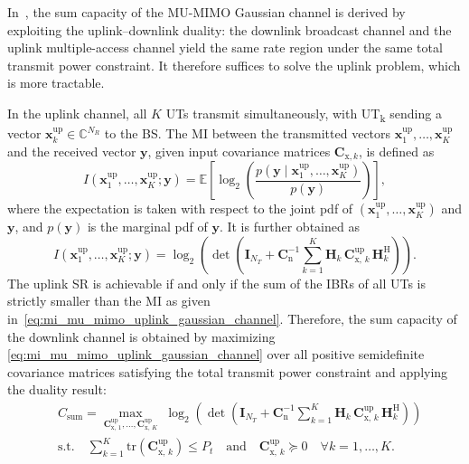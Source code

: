 In~\cite{viswanath_2002, viswanath_2003, yu_2004}, the sum capacity of the \ac{MU}-\ac{MIMO} Gaussian channel is derived by exploiting the uplink--downlink duality: the downlink broadcast channel and the uplink multiple-access channel yield
the same rate region under the same total transmit power constraint. It therefore suffices to solve the uplink problem, which is more tractable.

In the uplink channel, all $K$ \acp{UT} transmit simultaneously, with \ac{UT}\textsubscript{k} sending a vector $\mathbf{x}_k^{\text{up}} \in \mathbb{C}^{N_R}$ to the \ac{BS}.
The \ac{MI} between the transmitted vectors $\mathbf{x}_1^{\text{up}}, \dots, \mathbf{x}_K^{\text{up}}$ and the received vector $\mathbf{y}$, given input covariance matrices $\mathbf{C}_{\mathrm{x},k}$, is defined as
\begin{equation}
\label{eq:mutual_information_mu_mimo_uplink}
    I(\mathbf{x}_1^{\text{up}}, \dots, \mathbf{x}_K^{\text{up}}; \mathbf{y})
    = \mathbb{E}\!\left[ \log_2\!\left( \frac{p(\mathbf{y} \mid \mathbf{x}_1^{\text{up}}, \dots, \mathbf{x}_K^{\text{up}})}{p(\mathbf{y})} \right) \right],
\end{equation}
where the expectation is taken with respect to the joint \ac{pdf} of $(\mathbf{x}_1^{\text{up}}, \dots, \mathbf{x}_K^{\text{up}})$ and $\mathbf{y}$, and $p(\mathbf{y})$ is the marginal \ac{pdf} of $\mathbf{y}$.
It is further obtained as
\begin{equation}
\label{eq:mi_mu_mimo_uplink_gaussian_channel}
    I(\mathbf{x}_1^{\text{up}}, \dots, \mathbf{x}_K^{\text{up}}; \mathbf{y})
    = \log_2\!\left(\det\!\left(\mathbf{I}_{N_T} + \mathbf{C}_{\mathrm{n}}^{-1} \sum_{k=1}^{K} \mathbf{H}_k\,\mathbf{C}_{\mathrm{x},\, k}^{\text{up}}\,\mathbf{H}_k^\mathrm{H} \right)\right).
\end{equation}
The uplink \ac{SR} is achievable if and only if the sum of the \ac{IBR}s of all \acp{UT} is strictly smaller than the \ac{MI} as given in~\eqref{eq:mi_mu_mimo_uplink_gaussian_channel}. Therefore, the sum capacity of the downlink channel is obtained by maximizing \eqref{eq:mi_mu_mimo_uplink_gaussian_channel} over all positive semidefinite covariance matrices satisfying the total transmit power constraint and applying the duality result:
\begin{equation}
\label{eq:sum_capacity_mu_mimo_gaussian_channel}
\begin{aligned}
    & C_{\text{sum}} = \max_{\mathbf{C}_{\mathrm{x},\,1}^{\text{up}}, \dots, \mathbf{C}_{\mathrm{x},\,K}^{\text{up}}} \; \log_2\!\left(\det\!\left(\mathbf{I}_{N_T} + \mathbf{C}_{\mathrm{n}}^{-1} \sum_{k=1}^{K} \mathbf{H}_k\,\mathbf{C}_{\mathrm{x},\, k}^{\text{up}}\,\mathbf{H}_k^\mathrm{H} \right)\right) \\
    &\text{s.t.} \quad \sum_{k=1}^{K} \mathrm{tr}\!\left(\mathbf{C}_{\mathrm{x},\, k}^{\text{up}}\right) \leq P_t \quad \text{and} \quad \mathbf{C}_{\mathrm{x},\, k}^{\text{up}} \succeq 0 \quad \forall k = 1, \dots, K.
\end{aligned}
\end{equation}

